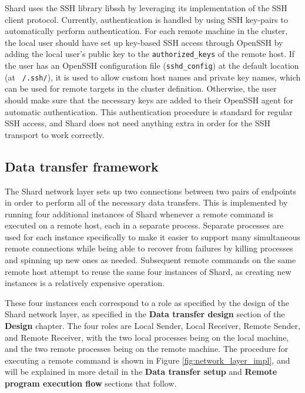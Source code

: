 \documentclass[oneside]{report}
\begin{document}
Shard uses the SSH library libssh by leveraging its implementation of the SSH client protocol.
Currently, authentication is handled by using SSH key-pairs to automatically perform authentication.
For each remote machine in the cluster, the local user should have set up key-based SSH access through OpenSSH by adding the local user's public key to the \texttt{authorized\_keys} of the remote host.
If the user has an OpenSSH configuration file (\texttt{sshd\_config}) at the default location (at \texttt{~/.ssh/}), it is used to allow custom host names and private key names, which can be used for remote targets in the cluster definition.
Otherwise, the user should make sure that the necessary keys are added to their OpenSSH agent for automatic authentication.
This authentication procedure is standard for regular SSH access, and Shard does not need anything extra in order for the SSH transport to work correctly.

\subsection{Data transfer framework}

The Shard network layer sets up two connections between two pairs of endpoints in order to perform all of the necessary data transfers.
This is implemented by running four additional instances of Shard whenever a remote command is executed on a remote host, each in a separate process.
Separate processes are used for each instance specifically to make it easier to support many simultaneous remote connections while being able to recover from failures by killing processes and spinning up new ones as needed.
Subsequent remote commands on the same remote host attempt to reuse the same four instances of Shard, as creating new instances is a relatively expensive operation.

These four instances each correspond to a role as specified by the design of the Shard network layer, as specified in the \textbf{Data transfer design} section of the \textbf{Design} chapter.
The four roles are Local Sender, Local Receiver, Remote Sender, and Remote Receiver, with the two local processes being on the local machine, and the two remote processes being on the remote machine.
The procedure for executing a remote command is shown in Figure \ref{fig:network_layer_impl}, and will be explained in more detail in the \textbf{Data transfer setup} and \textbf{Remote program execution flow} sections that follow.
\end{document}
